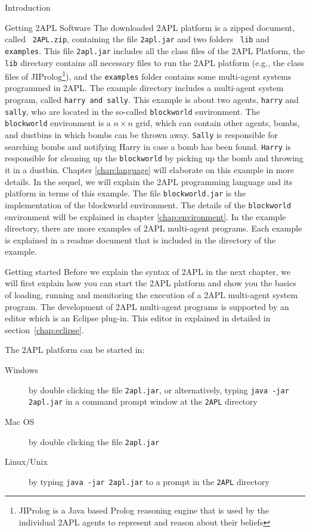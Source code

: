 \begin{chapter}{Introduction}
\begin{section}{Getting 2APL Software}
The downloaded 2APL platform is a zipped document, called {\tt
2APL.zip}, containing the file {\tt 2apl.jar} and two folders {\tt
lib} and {\tt examples}. This file {\tt 2apl.jar} includes all the
class files of the 2APL Platform, the {\tt lib} directory contains
all necessary files to run the 2APL platform (e.g., the class files
of JIProlog\footnote{JIProlog is a Java based Prolog reasoning
engine that is used by the individual 2APL agents to represent and
reason about their beliefs}), and the {\tt examples} folder contains
some multi-agent systems programmed in 2APL. The example directory
includes a multi-agent system program, called {\tt harry and sally}.
This example is about two agents, {\tt harry} and {\tt sally}, who
are located in the so-called {\tt blockworld} environment. The {\tt
blockworld} environment is a $n \times n$ grid, which can contain
other agents, bombs, and dustbins in which bombs can be thrown away.
{\tt Sally} is responsible for searching bombs and notifying Harry
in case a bomb has been found. {\tt Harry} is responsible for
cleaning up the {\tt blockworld} by picking up the bomb and throwing
it in a dustbin. Chapter \ref{chap:language} will elaborate on this
example in more details. In the sequel, we will explain the 2APL
programming language and its platform in terms of this example. The
file {\tt blockworld.jar} is the implementation of the blockworld
environment. The details of the {\tt blockworld} environment will be
explained in chapter \ref{chap:environment}. In the example
directory, there are more examples of 2APL multi-agent programs.
Each example is explained in a readme document that is included in
the directory of the example.
\end{section}

\begin{section}{Getting started}
Before we explain the syntax of 2APL in the next chapter, we will
first explain how you can start the 2APL platform and show you the
basics of loading, running and monitoring the execution of a 2APL
multi-agent system program. The development of 2APL multi-agent
programs is supported by an editor which is an Eclipse plug-in. This
editor in explained in detailed in section~\ref{chap:eclipse}.

The 2APL platform can be started in:
    \begin{description}
        \item[Windows] by double clicking the file {\tt 2apl.jar}, or
            alternatively, typing {\tt java -jar 2apl.jar} in a command prompt window at
            the {\tt 2APL} directory
        \item[Mac OS] by double clicking the file {\tt 2apl.jar}
        \item[Linux/Unix] by typing {\tt java -jar 2apl.jar} to a
            prompt in the {\tt 2APL} directory
    \end{description}


\end{section}
\end{chapter}
